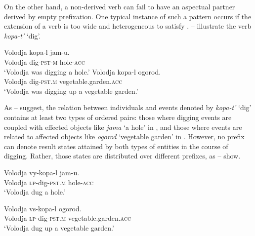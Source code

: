 \documentclass[output=paper,colorlinks,citecolor=brown]{langscibook}
\begin{document}
On the other hand, a non-derived verb can fail to have an aspectual partner derived by empty prefixation. One typical instance of such a pattern occurs if the extension of a verb is too wide and heterogeneous to satisfy . -- illustrate the verb \textit{kopa-t’} ‘dig’.

\ea\label{ex:tatevosov:104}
\ea 
\gll    Volodja   kopa-l   jam-u. \\
    Volodja   dig-\textsc{pst-m}   hole-\textsc{acc} \\
\glt  ‘Volodja was digging a hole.’\label{ex:tatevosov:104a}
\ex
\gll    Volodja   kopa-l   ogorod. \\
    Volodja   dig-\textsc{pst.m} vegetable.garden.\textsc{acc}\\
\glt  ‘Volodja was digging up a vegetable garden.’\label{ex:tatevosov:104b}
\z
\z

\noindent As -- suggest, the relation between individuals and events denoted by \textit{kopa-t’} ‘dig’ contains at least two types of ordered pairs: those where digging events are coupled with effected objects like \textit{jama} ‘a hole’ in , and those where events are related to affected objects like \textit{ogorod} ‘vegetable garden’ in . However, no prefix can denote result states attained by both types of entities in the course of digging. Rather, those states are distributed over different prefixes, as -- show.

\ea\label{ex:tatevosov:105}
\ea
\gll   Volodja  vy-kopa-l  jam-u.  \\
    Volodja  \textsc{lp}-dig-\textsc{pst.m}  hole-\textsc{acc}  \\
\glt  ‘Volodja dug a hole.’\label{ex:tatevosov:105a}
\z
\z 

\ea\label{ex:tatevosov:106}
\ex
\gll   Volodja  vs-kopa-l  ogorod.  \\
    Volodja  \textsc{lp}-dig-\textsc{pst.m}  vegetable.garden.\textsc{acc}\\
\glt  ‘Volodja dug up a vegetable garden.’\label{ex:tatevosov:106b}
\z
\z
\end{document}
